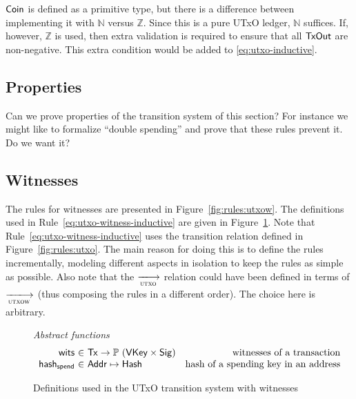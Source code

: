 \begin{note}
  $\mathsf{Coin}$ is defined as a primitive type, but there is a difference
  between implementing it with $\mathbb{N}$ versus $\mathbb{Z}$.
  Since this is a pure UTxO ledger, $\mathbb{N}$ suffices.
  If, however, $\mathbb{Z}$ is used, then extra validation is required
  to ensure that all $\mathsf{TxOut}$ are non-negative.
  This extra condition would be added to \cref{eq:utxo-inductive}.
\end{note}

\subsection{Properties}
\label{sec:utxo-properties}

\begin{todo}
  Can we prove properties of the transition system of this section? For
  instance we might like to formalize ``double spending'' and prove that these
  rules prevent it. Do we want it?
\end{todo}

\subsection{Witnesses}
\label{sec:witnesses}

The rules for witnesses are presented in Figure~\ref{fig:rules:utxow}.
The definitions used in Rule~\ref{eq:utxo-witness-inductive} are given in
Figure~\ref{fig:defs:utxow}. Note that
Rule~\ref{eq:utxo-witness-inductive} uses the transition relation defined in
Figure~\ref{fig:rules:utxo}. The main reason for doing this is to define
the rules incrementally, modeling different aspects in isolation to keep the
rules as simple as possible. Also note that the $\trans{utxo}{}$ relation could
have been defined in terms of $\trans{utxow}{}$ (thus composing the rules in a
different order). The choice here is arbitrary.

\begin{figure}
  \emph{Abstract functions}
  \begin{equation*}
    \begin{array}{r@{~\in~}lr}
      \fun{wits} & \Tx \to \powerset{(\VKey \times \Sig)}
      & \text{witnesses of a transaction}\\
      \fun{hash_{spend}} & \Addr \mapsto \Hash
      & \text{hash of a spending key in an address}\\
    \end{array}
  \end{equation*}
  \caption{Definitions used in the UTxO transition system with witnesses}
  \label{fig:defs:utxow}
\end{figure}

